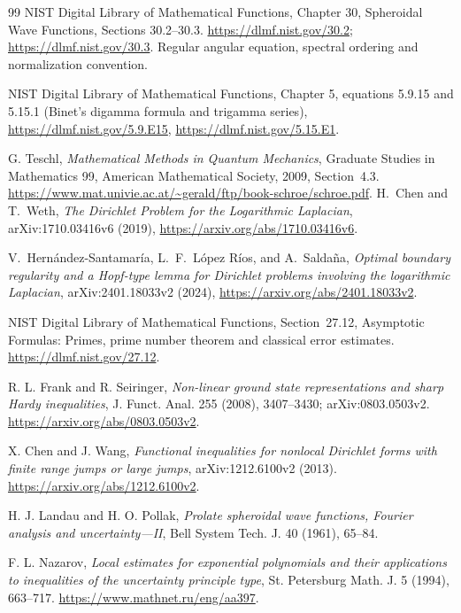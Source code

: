 \documentclass[11pt]{article}
\theoremstyle{remark}
\begin{document}
\begin{thebibliography}{99}
NIST Digital Library of Mathematical Functions, Chapter 30,
Spheroidal Wave Functions, Sections 30.2--30.3.
\url{https://dlmf.nist.gov/30.2};
\url{https://dlmf.nist.gov/30.3}.
Regular angular equation, spectral ordering and normalization convention.

NIST Digital Library of Mathematical Functions, Chapter 5,
equations 5.9.15 and 5.15.1 (Binet's digamma formula and trigamma series),
\url{https://dlmf.nist.gov/5.9.E15},
\url{https://dlmf.nist.gov/5.15.E1}.

G. Teschl, \emph{Mathematical Methods in Quantum Mechanics},
Graduate Studies in Mathematics 99, American Mathematical Society, 2009,
Section~4.3.
\url{https://www.mat.univie.ac.at/~gerald/ftp/book-schroe/schroe.pdf}.
H.~Chen and T.~Weth,
\emph{The Dirichlet Problem for the Logarithmic Laplacian},
arXiv:1710.03416v6 (2019),
\url{https://arxiv.org/abs/1710.03416v6}.

V.~Hern\'andez-Santamar\'ia, L.~F.~L\'opez R\'ios, and A.~Salda\~na,
\emph{Optimal boundary regularity and a Hopf-type lemma for Dirichlet
problems involving the logarithmic Laplacian},
arXiv:2401.18033v2 (2024),
\url{https://arxiv.org/abs/2401.18033v2}.

NIST Digital Library of Mathematical Functions, Section~27.12,
Asymptotic Formulas: Primes, prime number theorem and classical error
estimates. \url{https://dlmf.nist.gov/27.12}.

R. L. Frank and R. Seiringer,
\emph{Non-linear ground state representations and sharp Hardy inequalities},
J. Funct. Anal. 255 (2008), 3407--3430;
arXiv:0803.0503v2.
\url{https://arxiv.org/abs/0803.0503v2}.

X. Chen and J. Wang,
\emph{Functional inequalities for nonlocal Dirichlet forms with finite
range jumps or large jumps},
arXiv:1212.6100v2 (2013).
\url{https://arxiv.org/abs/1212.6100v2}.

H. J. Landau and H. O. Pollak,
\emph{Prolate spheroidal wave functions, Fourier analysis and
uncertainty---II},
Bell System Tech. J. 40 (1961), 65--84.

F. L. Nazarov,
\emph{Local estimates for exponential polynomials and their
applications to inequalities of the uncertainty principle type},
St. Petersburg Math. J. 5 (1994), 663--717.
\url{https://www.mathnet.ru/eng/aa397}.


\end{thebibliography}
\end{document}
